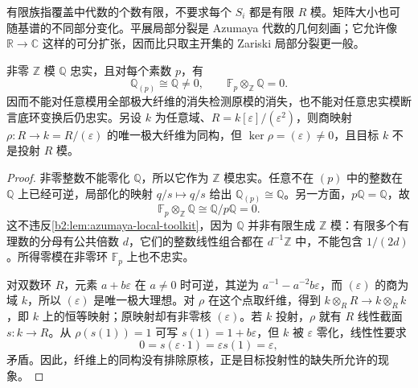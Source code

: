 有限族指覆盖中代数的个数有限，不要求每个 \(S_i\) 都是有限 \(R\) 模。矩阵大小也可随基谱的不同部分变化。平展局部分裂是 Azumaya 代数的几何刻画；它允许像 \(\mathbb R\to\mathbb C\) 这样的可分扩张，因而比只取主开集的 Zariski 局部分裂更一般。

\begin{proposition}[纤维判据的适用条件]\label{b2:prop:C-fiber-hypothesis-boundaries}
	非零 \(\mathbb Z\) 模 \(\mathbb Q\) 忠实，且对每个素数 \(p\)，有
	\[
		\mathbb Q_{(p)}\cong\mathbb Q\ne0, \qquad \mathbb F_p\otimes_{\mathbb Z}\mathbb Q=0.
	\]
	因而不能对任意模用全部极大纤维的消失检测原模的消失，也不能对任意忠实模断言底环变换后仍忠实。另设 \(k\) 为任意域、\(R=k[\varepsilon]/(\varepsilon^2)\)，则商映射 \(\rho:R\to k=R/(\varepsilon)\) 的唯一极大纤维为同构，但 \(\ker\rho=(\varepsilon)\ne0\)，且目标 \(k\) 不是投射 \(R\) 模。
\end{proposition}
\begin{proof}
	非零整数不能零化 \(\mathbb Q\)，所以它作为 \(\mathbb Z\) 模忠实。任意不在 \((p)\) 中的整数在 \(\mathbb Q\) 上已经可逆，局部化的映射 \(q/s\mapsto q/s\) 给出 \(\mathbb Q_{(p)}\cong\mathbb Q\)。另一方面，\(p\mathbb Q=\mathbb Q\)，故
	\[
		\mathbb F_p\otimes_{\mathbb Z}\mathbb Q \cong\mathbb Q/p\mathbb Q=0.
	\]
	这不违反\cref{b2:lem:azumaya-local-toolkit}，因为 \(\mathbb Q\) 并非有限生成 \(\mathbb Z\) 模：有限多个有理数的分母有公共倍数 \(d\)，它们的整数线性组合都在 \(d^{-1}\mathbb Z\) 中，不能包含 \(1/(2d)\)。所得零模在非零环 \(\mathbb F_p\) 上也不忠实。

	对双数环 \(R\)，元素 \(a+b\varepsilon\) 在 \(a\ne0\) 时可逆，其逆为 \(a^{-1}-a^{-2}b\varepsilon\)，而 \((\varepsilon)\) 的商为域 \(k\)，所以 \((\varepsilon)\) 是唯一极大理想。对 \(\rho\) 在这个点取纤维，得到 \(k\otimes_RR\to k\otimes_Rk\)，即 \(k\) 上的恒等映射；原映射却有非零核 \((\varepsilon)\)。若 \(k\) 投射，\(\rho\) 就有 \(R\) 线性截面 \(s:k\to R\)。从 \(\rho(s(1))=1\) 可写 \(s(1)=1+b\varepsilon\)，但 \(k\) 被 \(\varepsilon\) 零化，线性性要求
	\[
		0=s(\varepsilon\cdot1)=\varepsilon s(1)=\varepsilon,
	\]
	矛盾。因此，纤维上的同构没有排除原核，正是目标投射性的缺失所允许的现象。
\end{proof}

